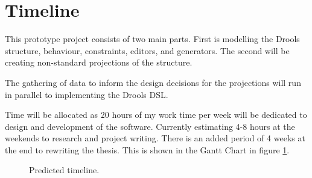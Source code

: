 \section{Timeline}

This prototype project consists of two main parts.
First is modelling the Drools structure, behaviour, constraints, editors, and generators.
The second will be creating non-standard projections of the structure.

The gathering of data to inform the design decisions for the projections will run in parallel to implementing the Drools DSL.

Time will be allocated as 20 hours of my work time per week will be dedicated to design and development of the software.
Currently estimating 4-8 hours at the weekends to research and project writing.
There is an added period of 4 weeks at the end to rewriting the thesis.
This is shown in the Gantt Chart in figure \ref{fig:ganttchart}.

\begin{figure}[H]
    \centering
    \caption{Predicted timeline.}
    \label{fig:ganttchart}
\end{figure}
